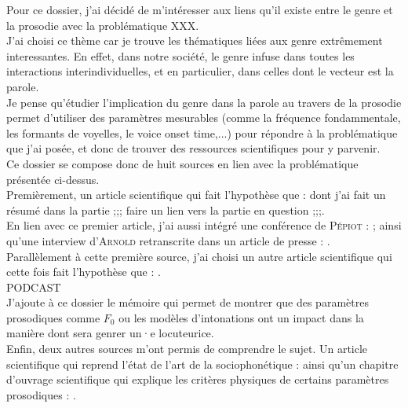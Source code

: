 Pour ce dossier, j'ai décidé de m'intéresser aux liens qu'il existe entre le genre et la prosodie avec la problématique XXX. \\
J'ai choisi ce thème car je trouve les thématiques liées aux genre extrêmement interessantes.
En effet, dans notre société, le genre infuse dans toutes les interactions interindividuelles, et en particulier, dans celles dont le vecteur est la parole. \\
Je pense qu'étudier l'implication du genre dans la parole au travers de la prosodie permet d'utiliser des paramètres mesurables (comme la fréquence fondammentale, les formants de voyelles, le voice onset time,...) pour répondre à la problématique que j'ai posée, et donc de trouver des ressources scientifiques pour y parvenir.\\

Ce dossier se compose donc de huit sources en lien avec la problématique présentée ci-dessus.\\
Premièrement, un article scientifique qui fait l'hypothèse que  : \cite{Pep20} dont j'ai fait un résumé dans la partie ;;; faire un lien vers la partie en question ;;;.\\
En lien avec ce premier article, j'ai aussi intégré une conférence de \textsc{Pépiot} : \cite{Pep16}; ainsi qu'une interview d'\textsc{Arnold} retranscrite dans un article de presse : \cite{Bro18}.\\
Parallèlement à cette première source, j'ai choisi un autre article scientifique qui cette fois fait l'hypothèse que  : \cite{Boe75}.\\
PODCAST\\
J'ajoute à ce dossier le mémoire \cite{Gar22} qui permet de montrer que des paramètres prosodiques comme $F_0$ ou les modèles d'intonations ont un impact dans la manière dont sera genrer un·e locuteurice.\\
Enfin, deux autres sources m'ont permis de comprendre le sujet. Un article scientifique qui reprend l'état de l'art de la sociophonétique : \cite{Can15} ainsi qu'un chapitre d'ouvrage scientifique qui explique les critères physiques de certains paramètres prosodiques : \cite{DiC13}.\\
